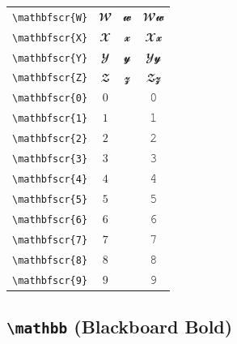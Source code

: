 \documentclass[12pt,a4paper]{article}
\begin{document}
\begin{longtable}{|c|c|c|c|}
\verb|\mathbfscr{W}| & $\mathbfscr{W}$ & $\mathbfscr{w}$ & $ 𝓦 𝔀 $ \\
\verb|\mathbfscr{X}| & $\mathbfscr{X}$ & $\mathbfscr{x}$ & $ 𝓧 𝔁 $ \\
\verb|\mathbfscr{Y}| & $\mathbfscr{Y}$ & $\mathbfscr{y}$ & $ 𝓨 𝔂 $ \\
\verb|\mathbfscr{Z}| & $\mathbfscr{Z}$ & $\mathbfscr{z}$ & $ 𝓩 𝔃 $ \\
\verb|\mathbfscr{0}| & $\mathbfscr{0}$ & & 𝟶 \\
\verb|\mathbfscr{1}| & $\mathbfscr{1}$ & & 𝟷 \\
\verb|\mathbfscr{2}| & $\mathbfscr{2}$ & & 𝟸 \\
\verb|\mathbfscr{3}| & $\mathbfscr{3}$ & & 𝟹 \\
\verb|\mathbfscr{4}| & $\mathbfscr{4}$ & & 𝟺 \\
\verb|\mathbfscr{5}| & $\mathbfscr{5}$ & & 𝟻 \\
\verb|\mathbfscr{6}| & $\mathbfscr{6}$ & & 𝟼 \\
\verb|\mathbfscr{7}| & $\mathbfscr{7}$ & & 𝟽 \\
\verb|\mathbfscr{8}| & $\mathbfscr{8}$ & & 𝟾 \\
\verb|\mathbfscr{9}| & $\mathbfscr{9}$ & & 𝟿 \\
\hline
\end{longtable}

\newpage

\subsection*{\texttt{\textbackslash{}mathbb} (Blackboard Bold)}
\end{document}
